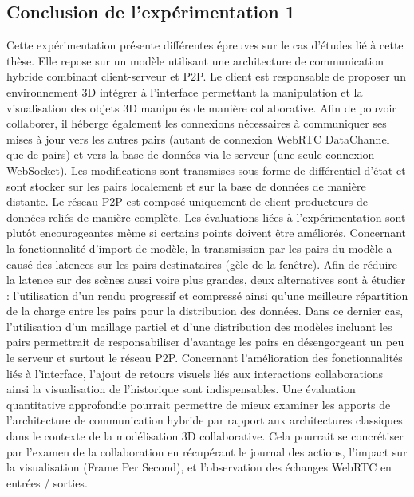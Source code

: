 \subsection{Conclusion de l'expérimentation 1}


Cette expérimentation présente différentes épreuves sur le cas d'études lié à cette 
thèse. Elle repose sur un modèle utilisant une architecture de communication 
hybride combinant client-serveur et \gls{P2P}. Le client est responsable de 
proposer un environnement 3D intégrer à l'interface permettant la manipulation et 
la visualisation des objets 3D manipulés de manière collaborative. Afin de pouvoir 
collaborer, il héberge également les connexions nécessaires à communiquer ses 
mises à jour vers les autres pairs (autant de connexion WebRTC DataChannel que 
de pairs) et vers la base de données via le serveur (une seule connexion 
WebSocket). Les modifications sont transmises sous forme de différentiel d'état et 
sont stocker sur les pairs localement et sur la base de données de manière 
distante. Le réseau \gls{P2P} est composé uniquement de client producteurs de 
données reliés de manière complète. 
Les évaluations liées à l'expérimentation sont plutôt encourageantes même si 
certains points doivent être améliorés. Concernant la fonctionnalité d'import de 
modèle, la transmission par les pairs du modèle a causé des latences sur les 
pairs destinataires (gèle de la fenêtre). Afin de réduire la latence sur des scènes 
aussi voire plus grandes, deux alternatives sont à étudier : l'utilisation d'un 
rendu progressif et compressé ainsi qu'une meilleure répartition de la charge entre 
les pairs pour la distribution des données. Dans ce dernier cas, l'utilisation d'un 
maillage partiel et d'une distribution des modèles incluant les pairs permettrait de 
responsabiliser d'avantage les pairs en désengorgeant un peu le serveur et surtout 
le réseau \gls{P2P}.
Concernant l'amélioration des fonctionnalités liés à l'interface, l'ajout de retours 
visuels liés aux interactions collaborations ainsi la visualisation de l'historique sont 
indispensables. Une évaluation quantitative approfondie pourrait permettre de 
mieux examiner les apports de l'architecture de communication hybride par rapport 
aux architectures classiques dans le contexte de la modélisation 3D collaborative. 
Cela pourrait se concrétiser par l'examen de la collaboration en récupérant le 
journal des actions, l'impact sur la visualisation (Frame Per Second), et 
l'observation des échanges WebRTC en entrées / sorties.


